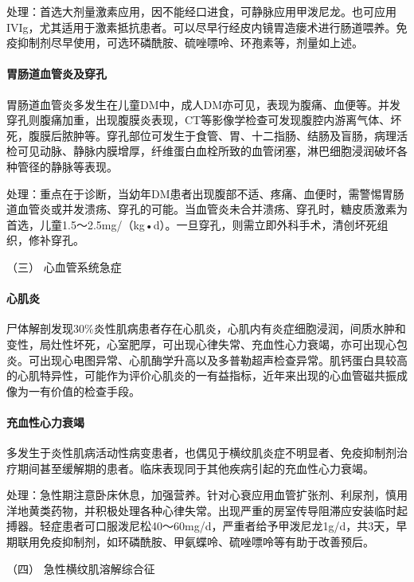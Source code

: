 处理：首选大剂量激素应用，因不能经口进食，可静脉应用甲泼尼龙。也可应用IVIg，尤其适用于激素抵抗患者。可以尽早行经皮内镜胃造瘘术进行肠道喂养。免疫抑制剂尽早使用，可选环磷酰胺、硫唑嘌呤、环孢素等，剂量如上述。

\paragraph{胃肠道血管炎及穿孔}

胃肠道血管炎多发生在儿童DM中，成人DM亦可见，表现为腹痛、血便等。并发穿孔则腹痛加重，出现腹膜炎表现，CT等影像学检查可发现腹腔内游离气体、坏死，腹膜后脓肿等。穿孔部位可发生于食管、胃、十二指肠、结肠及盲肠，病理活检可见动脉、静脉内膜增厚，纤维蛋白血栓所致的血管闭塞，淋巴细胞浸润破坏各种管径的静脉等表现。

处理：重点在于诊断，当幼年DM患者出现腹部不适、疼痛、血便时，需警惕胃肠道血管炎或并发溃疡、穿孔的可能。当血管炎未合并溃疡、穿孔时，糖皮质激素为首选，儿童1.5～2.5mg/（kg•d）。一旦穿孔，则需立即外科手术，清创坏死组织，修补穿孔。

\hypertarget{text00350.htmlux5cux23CHP14-3-3-4-3}{}
（三） 心血管系统急症

\paragraph{心肌炎}

尸体解剖发现30\%炎性肌病患者存在心肌炎，心肌内有炎症细胞浸润，间质水肿和变性，局灶性坏死，心室肥厚，可出现心律失常、充血性心力衰竭，亦可出现心包炎。可出现心电图异常、心肌酶学升高以及多普勒超声检查异常。肌钙蛋白具较高的心肌特异性，可能作为评价心肌炎的一有益指标，近年来出现的心血管磁共振成像为一有价值的检查手段。

\paragraph{充血性心力衰竭}

多发生于炎性肌病活动性病变患者，也偶见于横纹肌炎症不明显者、免疫抑制剂治疗期间甚至缓解期的患者。临床表现同于其他疾病引起的充血性心力衰竭。

处理：急性期注意卧床休息，加强营养。针对心衰应用血管扩张剂、利尿剂，慎用洋地黄类药物，并积极处理各种心律失常。出现严重的房室传导阻滞应安装临时起搏器。轻症患者可口服泼尼松40～60mg/d，严重者给予甲泼尼龙1g/d，共3天，早期联用免疫抑制剂，如环磷酰胺、甲氨蝶呤、硫唑嘌呤等有助于改善预后。

\hypertarget{text00350.htmlux5cux23CHP14-3-3-4-4}{}
（四） 急性横纹肌溶解综合征

